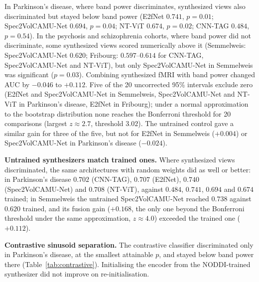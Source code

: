 \documentclass{article}
\begin{document}
In Parkinson's disease, where band power discriminates, synthesized views also discriminated but stayed below band power (E2fNet $0.741$, $p=0.01$; Spec2VolCAMU-Net $0.694$, $p=0.04$; NT-ViT $0.674$, $p=0.02$; CNN-TAG $0.484$, $p=0.54$). In the psychosis and schizophrenia cohorts, where band power did not discriminate, some synthesized views scored numerically above it (Semmelweis: Spec2VolCAMU-Net $0.620$; Fribourg: $0.597$--$0.614$ for CNN-TAG, Spec2VolCAMU-Net and NT-ViT), but only Spec2VolCAMU-Net in Semmelweis was significant ($p=0.03$). Combining synthesized fMRI with band power changed AUC by $-0.046$ to $+0.112$. Five of the 20 uncorrected 95\% intervals exclude zero (E2fNet and Spec2VolCAMU-Net in Semmelweis, Spec2VolCAMU-Net and NT-ViT in Parkinson's disease, E2fNet in Fribourg); under a normal approximation to the bootstrap distribution none reaches the Bonferroni threshold for 20 comparisons (largest $z\approx2.7$, threshold $3.02$). The untrained control gave a similar gain for three of the five, but not for E2fNet in Semmelweis ($+0.004$) or Spec2VolCAMU-Net in Parkinson's disease ($-0.024$).

\noindent\textbf{Untrained synthesizers match trained ones.} Where synthesized views discriminated, the same architectures with random weights did as well or better: in Parkinson's disease $0.702$ (CNN-TAG), $0.707$ (E2fNet), $0.740$ (Spec2VolCAMU-Net) and $0.708$ (NT-ViT), against $0.484$, $0.741$, $0.694$ and $0.674$ trained; in Semmelweis the untrained Spec2VolCAMU-Net reached $0.738$ against $0.620$ trained, and its fusion gain ($+0.168$, the only one beyond the Bonferroni threshold under the same approximation, $z\approx4.0$) exceeded the trained one ($+0.112$).

\noindent\textbf{Contrastive sinusoid separation.} The contrastive classifier discriminated only in Parkinson's disease, at the smallest attainable $p$, and stayed below band power there (Table~\ref{tab:contrastive}). Initialising the encoder from the NODDI-trained synthesizer did not improve on re-initialisation.
\end{document}
